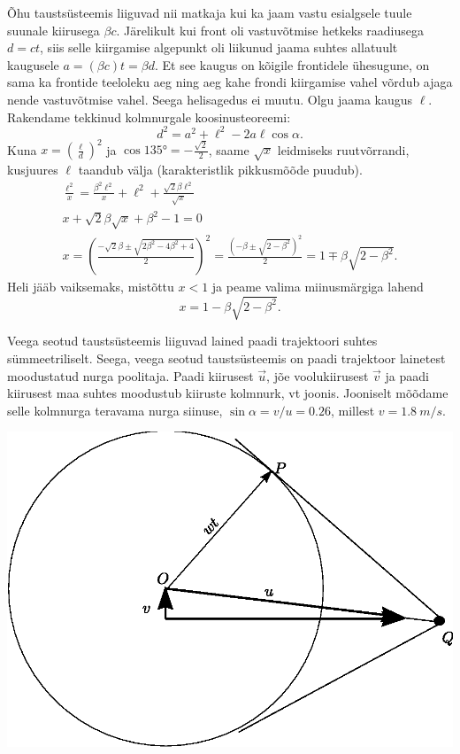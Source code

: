 \documentclass[10pt, twoside]{article}
\begin{document}
{Õhu taustsüsteemis liiguvad nii matkaja kui ka jaam vastu esialgsele tuule suunale kiirusega $\beta c$. Järelikult kui front oli vastuvõtmise hetkeks raadiusega $d = ct$, siis selle kiirgamise algepunkt oli liikunud jaama suhtes allatuult kaugusele $a = (\beta c)t = \beta d$. Et see kaugus on kõigile frontidele ühesugune, on sama ka frontide teeloleku aeg ning aeg kahe frondi kiirgamise vahel võrdub ajaga nende vastuvõtmise vahel. Seega helisagedus ei muutu. Olgu jaama kaugus $\ell$. Rakendame tekkinud kolmnurgale koosinusteoreemi:
\[
d^{2}=a^{2}+\ell^{2}-2 a \ell \cos \alpha.
\]
Kuna $x = \left(\frac{\ell}{d}\right)^2$ ja $\cos \ang{135}=-\frac{\sqrt{2}}{2}$, saame $\sqrt x$ leidmiseks ruutvõrrandi, kusjuures $\ell$ taandub välja (karakteristlik pikkusmõõde puudub).
\[
\begin{array}{c}{\frac{\ell^{2}}{x}=\frac{\beta^{2} \ell^{2}}{x}+\ell^{2}+\frac{\sqrt{2} \beta \ell^{2}}{\sqrt{x}}} \\ {x+\sqrt{2} \beta \sqrt{x}+\beta^{2}-1=0} \\ {x=\left(\frac{-\sqrt{2} \beta \pm \sqrt{2 \beta^{2}-4 \beta^{2}+4}}{2}\right)^{2}=\frac{\left(-\beta \pm \sqrt{2-\beta^{2}}\right)^{2}}{2}=1 \mp \beta \sqrt{2-\beta^{2}}.}\end{array}
\]
Heli jääb vaiksemaks, mistõttu $x < 1$ ja peame valima miinusmärgiga lahend
\[
x=1-\beta \sqrt{2-\beta^{2}}.
\]
\probend
\bigskip


\solu
\osa
Veega seotud taustsüsteemis liiguvad lained paadi trajektoori suhtes sümmeetriliselt. Seega, veega seotud taustsüsteemis on
paadi trajektoor lainetest moodustatud nurga poolitaja. Paadi kiirusest $\vec u$, jõe voolukiirusest $\vec v$ ja paadi kiirusest maa suhtes moodustub kiiruste kolmnurk, vt joonis.
Jooniselt mõõdame selle kolmnurga teravama nurga siinuse, $\sin \alpha =v/u=\num{0.26}$, millest $v=\SI{1.8}{m/s}$.

\begin{center}
	\includegraphics[width=0.8\linewidth]{2009-v3g-08-paatlah.eps}
\end{center}

}
\end{document}
